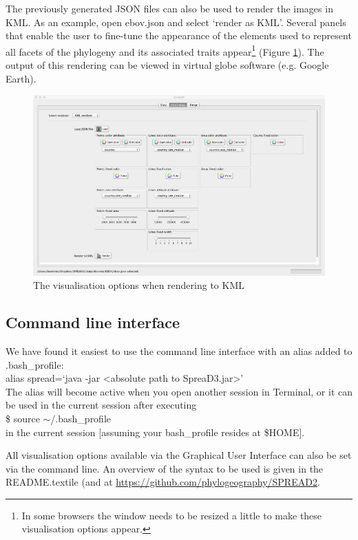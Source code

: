 \documentclass[english]{paper}
\begin{document}
The previously generated JSON files can also be used to render the images in KML. 
As an example, open ebov.json and select `render as KML'.
Several panels that enable the user to fine-tune the appearance of the elements used to represent all facets of the phylogeny and its associated traits appear\footnote{In some browsers the window needs to be resized a little to make these visualisation options appear.} (Figure \ref{fig:KMLrender}).
The output of this rendering can be viewed in virtual globe software (e.g. Google Earth).

\begin{figure}[!H]
\centering
\includegraphics[width=1\textwidth]{./figures/kml_render.pdf} 
\caption{The visualisation options when rendering to KML}
\label{fig:KMLrender}
\end{figure}


\subsection{Command line interface}
\label{CLI}

We have found it easiest to use the command line interface with an alias added to .bash\_profile:
\\
alias spread=`java -jar <absolute path to SpreaD3.jar>' 
\\
The alias will become active when you open another session in Terminal, or it can be used in the current session after executing
\\
\$ source $\sim$/.bash\_profile
\\
in the current session  [assuming your bash\_profile resides at \$HOME]. 
\par
All visualisation options available via the Graphical User Interface can also be set via the command line. 
An overview of the syntax to be used is given in the README.textile (and at \url{https://github.com/phylogeography/SPREAD2}.


 
\end{document}
